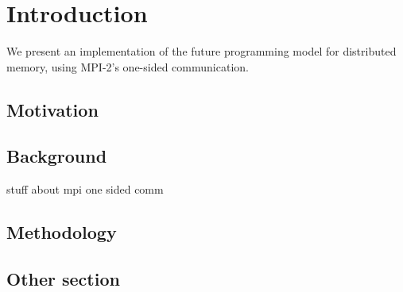 \chapter{Introduction}
We present an implementation of the future programming model for distributed memory,
using MPI-2's one-sided communication.


\section{Motivation}

\section{Background}
stuff about mpi one sided comm

\section{Methodology}

\section{Other section}
